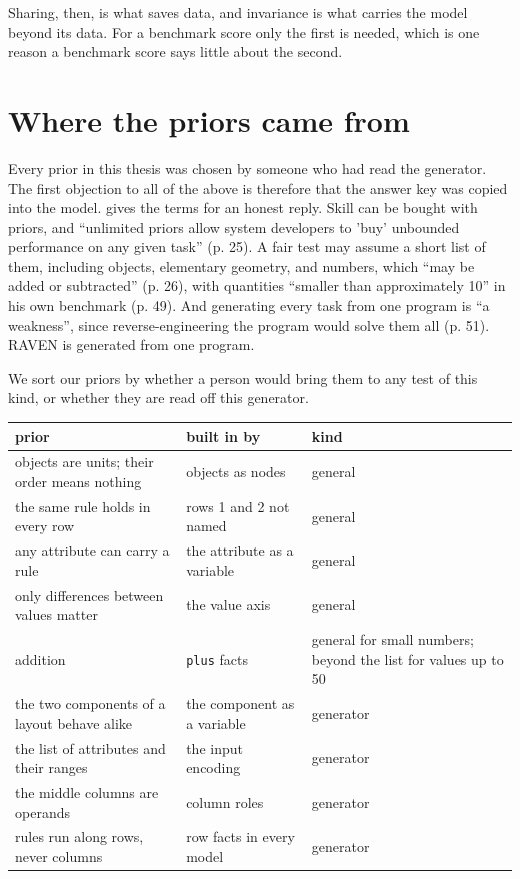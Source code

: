 Sharing, then, is what saves data, and invariance is what carries the model beyond its data. For a benchmark score only the first is needed, which is one reason a benchmark score says little about the second.

\section{Where the priors came from}\label{sec:8.4}

Every prior in this thesis was chosen by someone who had read the generator. The first objection to all of the above is therefore that the answer key was copied into the model. \citet{chollet2019measure} gives the terms for an honest reply. Skill can be bought with priors, and ``unlimited priors allow system developers to 'buy' unbounded performance on any given task'' (p. 25). A fair test may assume a short list of them, including objects, elementary geometry, and numbers, which ``may be added or subtracted'' (p. 26), with quantities ``smaller than approximately 10'' in his own benchmark (p. 49). And generating every task from one program is ``a weakness'', since reverse-engineering the program would solve them all (p. 51). RAVEN is generated from one program.

We sort our priors by whether a person would bring them to any test of this kind, or whether they are read off this generator.

\begin{center}\small
\begin{tabularx}{\linewidth}{@{}YYY@{}}
\toprule
prior & built in by & kind \\
\midrule
objects are units; their order means nothing & objects as nodes & general \\
the same rule holds in every row & rows 1 and 2 not named & general \\
any attribute can carry a rule & the attribute as a variable & general \\
only differences between values matter & the value axis & general \\
addition & \texttt{plus} facts & general for small numbers; beyond the list for values up to 50 \\
the two components of a layout behave alike & the component as a variable & generator \\
the list of attributes and their ranges & the input encoding & generator \\
the middle columns are operands & column roles & generator \\
rules run along rows, never columns & row facts in every model & generator \\
\bottomrule
\end{tabularx}
\end{center}

